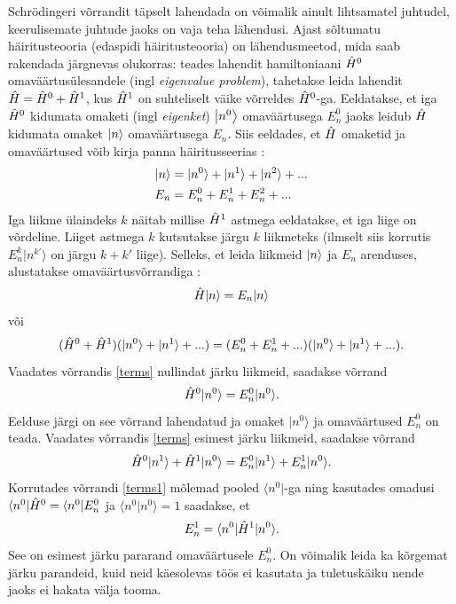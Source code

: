 \documentclass{trkut}%
\renewcommand\bra[1]{{\langle{#1}|}}
\renewcommand\ket[1]{{|{#1}\rangle}}
\renewcommand\Ket[1]{\mleft|#1\mright\rangle}
\renewcommand\braket[1]{\langle{#1}\rangle}
\begin{document}
Schrödingeri võrrandit täpselt lahendada on võimalik ainult lihtsamatel juhtudel, keerulisemate juhtude jaoks on vaja teha lähendusi.
Ajast sõltumatu häiritusteooria (edaspidi häiritusteooria) on lähendusmeetod, mida saab rakendada järgnevas olukorras: teades lahendit hamiltoniaani $\op[0]{H}$ omaväärtusülesandele (ingl \textit{eigenvalue problem}), tahetakse leida lahendit $\op{H}=\op[0]{H}+\op[1]{H}$, kus $\op[1]{H}$ on suhteliselt väike võrreldes $\op[0]{H}$-ga.
Eeldatakse, et iga $\op[0]{H}$ kidumata omaketi (ingl \textit{eigenket}) $\Ket{n^0}$ omaväärtusega $E_n^0$ jaoks leidub $\op{H}$ kidumata omaket $\Ket{n}$ omaväärtusega $E_n$.
Siis eeldades, et $\op{H}$ omaketid ja omaväärtused võib kirja panna häiritusseerias \parencite[451]{shankar94}:
\begin{align}
    \Ket{n}&=\ket{n^0}+\ket{n^1}+\ket{n^2}+... \\
    E_n&=E_n^0+E_n^1+E_n^2+...
\end{align}
Iga liikme ülaindeks $k$ näitab millise $\op[1]{H}$ astmega eeldatakse, et iga liige on võrdeline.
Liiget astmega $k$ kutsutakse järgu $k$ liikmeteks (ilmselt siis korrutis $E_n^k \ket{n^{k'}}$ on järgu $k+k'$ liige).
Selleks, et leida liikmeid $\Ket{n}$ ja $E_n$ arenduses, alustatakse omaväärtusvõrrandiga \parencite[451-452]{shankar94}:
\begin{equation}
    \op{H}\ket{n}=E_n\ket{n}
\end{equation}
või
\begin{equation}
    (\op[0]{H} + \op[1]{H})(\ket{n^0}+\ket{n^1}+...)=(E_n^0+E_n^1+...) (\ket{n^0}+\ket{n^1}+...).
    \label{terms}
\end{equation}
Vaadates võrrandis \eqref{terms} nullindat järku liikmeid, saadakse võrrand
\begin{equation}
    \op[0]{H}\ket{n^0}=E_n^0\ket{n^0}.
\end{equation}
Eelduse järgi on see võrrand lahendatud ja omaket $\ket{n^0}$ ja omaväärtused $E_n^0$ on teada. Vaadates võrrandis \eqref{terms} esimest järku liikmeid, saadakse võrrand
\begin{equation}
    \op[0]{H}\ket{n^1} + \op[1]{H}\ket{n^0} = E_n^0\ket{n^1} + E_n^1\ket{n^0}.
    \label{terms1}
\end{equation}
Korrutades võrrandi \eqref{terms1} mõlemad pooled $\bra{n^0}$-ga ning kasutades omadusi $\bra{n^0}\op[0]{H}=\bra{n^0}E_n^0$ ja $\braket{n^0|n^0}=1$ saadakse, et
\begin{equation}
    E_n^1=\braket{n^0|\op[1]{H}|n^0}.
    \label{parand1}
\end{equation}
See on esimest järku pararand omaväärtusele $E_n^0$.
On võimalik leida ka kõrgemat järku parandeid, kuid neid käesolevas töös ei kasutata ja tuletuskäiku nende jaoks ei hakata välja tooma.
\end{document}
